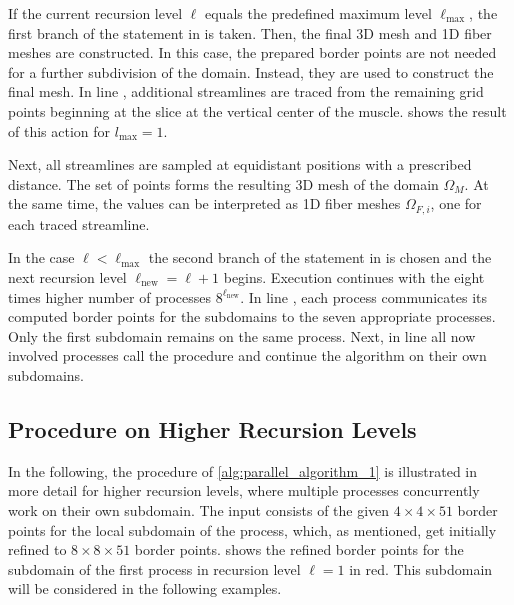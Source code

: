 If the current recursion level $\ell$ equals the predefined maximum level $\ell_\text{max}$, the first branch of the  statement in  is taken. Then, the final 3D mesh and 1D fiber meshes are constructed. In this case, the prepared border points are not needed for a further subdivision of the domain. Instead, they are used to construct the final mesh.
In line , additional streamlines are traced from the remaining grid points beginning at the slice at the vertical center of the muscle.  shows the result of this action for $l_\text{max}=1$.

Next, all streamlines are sampled at equidistant positions with a prescribed distance. The set of points forms the resulting 3D mesh of the domain $\Omega_M$. At the same time, the values can be interpreted as 1D fiber meshes $\Omega_{F,i}$, one for each traced streamline.

In the case $\ell < \ell_\text{max}$ the second branch of the  statement in  is chosen and the next recursion level $\ell_\text{new} = \ell+1$ begins. Execution continues with the eight times higher number of processes $8^{\ell_\text{new}}$.  In line , each process communicates its computed border points for the subdomains to the seven appropriate processes. Only the first subdomain remains on the same process. Next, in line  all now involved processes call the procedure and continue the algorithm on their own subdomains.

\subsection{Procedure on Higher Recursion Levels}

In the following, the procedure of \cref{alg:parallel_algorithm_1} is illustrated in more detail for higher recursion levels, where multiple processes concurrently work on their own subdomain. The input consists of the given $4 \times 4 \times 51$ border points for the local subdomain of the process, which, as mentioned, get initially refined to $8 \times 8 \times 51$ border points.  shows the refined border points for the subdomain of the first process in recursion level $\ell=1$ in red. This subdomain will be considered in the following examples.

